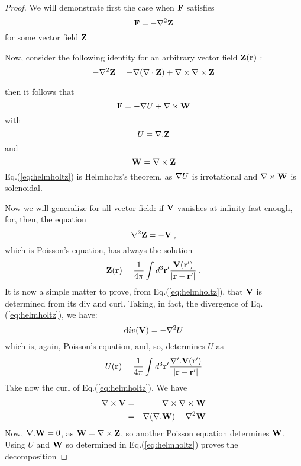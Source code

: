 \begin{proof}
 We will demonstrate first the case  when $\mathbf{ F}$ satisfies
\begin{equation}
\mathbf{ F}=-\mathbf{ \nabla}^2\mathbf{ Z}
\end{equation}
for some vector field $\mathbf{ Z}$


Now, consider the following identity for an arbitrary vector field $\mathbf{ Z}(\mathbf{ r})$ :
\begin{equation}
-\mathbf{ \nabla}^2\mathbf{ Z} = - \mathbf{ \nabla}(\mathbf{ \nabla}\cdot\mathbf{ Z})
+ \mathbf{ \nabla}\times\mathbf{ \nabla}\times\mathbf{ Z}
\end{equation}

then it follows that
\begin{equation}
\mathbf{ F}=-\mathbf{ \nabla}U + \mathbf{ \nabla}\times \mathbf{ W} \label{eq:helmholtz}
\end{equation}
with
\begin{equation}
U=\mathbf{ \nabla}.\mathbf{ Z}
\end{equation}
and
\begin{equation}
\mathbf{ W}=\mathbf{ \nabla}\times \mathbf{ Z}
\end{equation}
Eq.(\ref{eq:helmholtz}) is Helmholtz's theorem, as $\mathbf{ \nabla}U$ is
irrotational and $\mathbf{ \nabla}\times \mathbf{ W}$ is solenoidal.

Now we will generalize for all vector field:
if $\mathbf{ V}$ vanishes at infinity fast enough, for, then, the equation
\begin{equation}
\mathbf{ \nabla}^2\mathbf{ Z}=-\mathbf{ V} \;,
\end{equation}
which is Poisson's equation, has always the solution
\begin{equation}
\mathbf{ Z}(\mathbf{ r})= \dfrac{1}{4\pi}\displaystyle\int d^3\mathbf{ r'}\dfrac{\mathbf{ V}(\mathbf{ r'})}
{|\mathbf{ r}-\mathbf{ r'}|}\;.
\end{equation}
It is now a simple matter to prove, from Eq.(\ref{eq:helmholtz}), that
$\mathbf{ V}$ is determined from its $\mathrm{div}$ and $\mathrm{curl}$. Taking, in fact, the
divergence of Eq.(\ref{eq:helmholtz}), we have:
\begin{equation}
{\mathrm div} \mathbf{ \left({\mathbf V}\right)} = -\mathbf{ \nabla}^2 U
\end{equation}
which is, again, Poisson's equation, and, so, determines $U$ as
\begin{equation}
U(\mathbf{ r}) = \dfrac{1}{4\pi}\displaystyle\int
d^3\mathbf{ r'}\dfrac{\mathbf{ \nabla}'.\mathbf{ V}(\mathbf{ r'})}
{|\mathbf{ r}-\mathbf{ r'}|}
\end{equation}
Take now the $\mathrm{curl}$ of Eq.(\ref{eq:helmholtz}). We have
\begin{eqnarray}
\mathbf{ \nabla}\times\mathbf{ V} & = &
\mathbf{ \nabla}\times\mathbf{ \nabla}\times\mathbf{ W} \nonumber \\
    & = & \mathbf{ \nabla}(\mathbf{ \nabla}.\mathbf{ W}) - \mathbf{ \nabla}^2\mathbf{ W}
\end{eqnarray}
Now, $\mathbf{ \nabla}.\mathbf{ W}=0$, as $\mathbf{ W}=\mathbf{ \nabla}\times\mathbf{ Z}$, so
another Poisson equation determines $\mathbf{ W}$. Using $U$ and $\mathbf{ W}$ so
determined
in Eq.(\ref{eq:helmholtz}) proves the decomposition
\end{proof}


